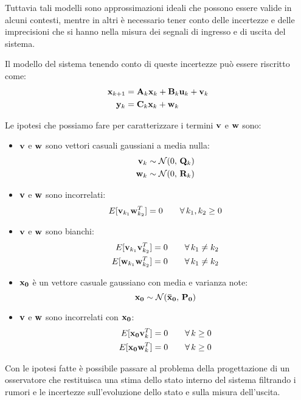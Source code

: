 Tuttavia tali modelli sono approssimazioni ideali che possono essere valide in alcuni contesti, mentre in altri è necessario tener conto delle incertezze e delle imprecisioni che si hanno nella misura dei segnali di ingresso e di uscita del sistema.

Il modello del sistema tenendo conto di queste incertezze può essere riscritto come:
\begin{align*}
\mathbf{x}_{k+1} &= \mathbf{A}_k\mathbf{x}_k + \mathbf{B}_k\mathbf{u}_k + \mathbf{v}_k \\
\mathbf{y}_k &= \mathbf{C}_k\mathbf{x}_k + \mathbf{w}_k
\end{align*}

\noindent Le ipotesi che possiamo fare per caratterizzare i termini $\mathbf{v}$ e $\mathbf{w}$ sono:
\begin{itemize}
\item $\mathbf{v}$ e $\mathbf{w}$ sono vettori casuali gaussiani a media nulla: 
\begin{align*}
 \mathbf{v}_k &\sim \mathcal{N}(0,\,\mathbf{Q}_k) \\
 \mathbf{w}_k &\sim \mathcal{N}(0,\,\mathbf{R}_k)
\end{align*}
\item $\mathbf{v}$ e $\mathbf{w}$ sono incorrelati:
 \[E[\mathbf{v}_{k_1}\mathbf{w}^T_{k_2}]=0\qquad \forall\, k_1,k_2 \geq 0\]
\item $\mathbf{v}$ e $\mathbf{w}$ sono bianchi: 
\begin{align*}
 E[\mathbf{v}_{k_1}\mathbf{v}^T_{k_2}]&=0\qquad \forall\, k_1 \neq k_2 \\
 E[\mathbf{w}_{k_1}\mathbf{w}^T_{k_2}]&=0\qquad \forall\, k_1 \neq k_2
\end{align*}
\item $\mathbf{x_0}$ è un vettore casuale gaussiano con media e varianza note:
\[\mathbf{x_0} \sim \mathcal{N}(\mathbf{\bar{x}_0},\,\mathbf{P_0})\]
\item $\mathbf{v}$ e $\mathbf{w}$ sono incorrelati con $\mathbf{x_0}$:
\begin{align*}
 E[\mathbf{x_0}\mathbf{v}^T_k]&=0\qquad \forall\, k \geq 0 \\
 E[\mathbf{x_0}\mathbf{w}^T_k]&=0\qquad \forall\, k \geq 0
\end{align*}
\end{itemize}

Con le ipotesi fatte è possibile passare al problema della progettazione di un osservatore che restituisca una stima dello stato interno del sistema filtrando i rumori e le incertezze sull'evoluzione dello stato e sulla misura dell'uscita.
\newpage